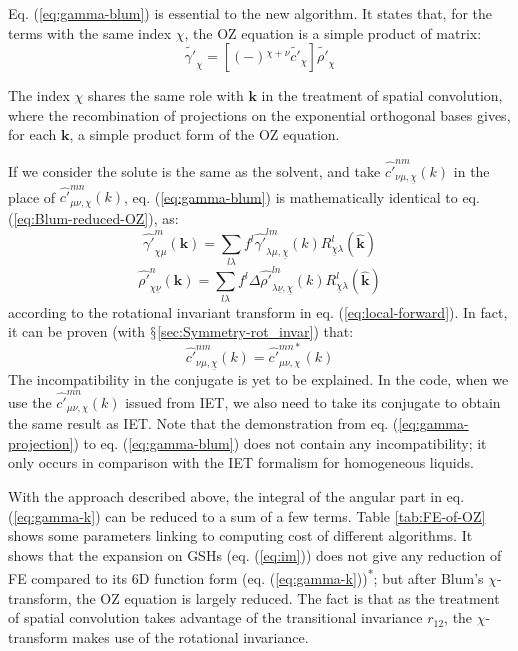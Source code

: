 Eq. (\ref{eq:gamma-blum}) is essential to the new algorithm. It states
that, for the terms with the same index $\chi$, the \acs{OZ} equation
is a simple product of matrix:
\begin{equation}
\tilde{\gamma'}_{\chi}=\left[\left(-\right){}^{\chi+\nu}\tilde{c'}_{\chi}\right]\tilde{\rho'}_{\chi}
\end{equation}

The index $\chi$ shares the same role with $\mathbf{k}$ in the treatment
of spatial convolution, where the recombination of projections on
the exponential orthogonal bases gives, for each $\mathbf{k}$, a simple
product form of the \acs{OZ} equation.

If we consider the solute is the same as the solvent, and take $\hat{c'}_{\nu\mu,\underline{\chi}}^{nm}(k)$
in the place of $\hat{c'}_{\mu\nu,\chi}^{mn}(k)$, eq. (\ref{eq:gamma-blum})
is mathematically identical to eq. (\ref{eq:Blum-reduced-OZ}), as:
\begin{equation}
\hat{\gamma'}_{\chi\mu}^{m}(\mathbf{k})=\sum_{l\lambda}f^{l}\hat{\gamma'}_{\lambda\mu,\underline{\chi}}^{lm}(k)R_{\underline{\chi}\lambda}^{l}(\hat{\mathbf{k}})
\end{equation}
\begin{equation}
\hat{\rho'}_{\chi\underline{\nu}}^{n}(\mathbf{k})=\sum_{l\lambda}f^{l}\Delta\hat{\rho'}_{\lambda\underline{\nu},\underline{\chi}}^{ln}(k)R_{\underline{\chi}\lambda}^{l}(\hat{\mathbf{k}})
\end{equation}
according to the rotational invariant transform in eq. (\ref{eq:local-forward}).
In fact, it can be proven (with $\mathsection$\ref{sec:Symmetry-rot_invar})
that:
\begin{equation}
\hat{c'}_{\nu\mu,\underline{\chi}}^{nm}(k)=\hat{c'}_{\mu\nu,\chi}^{mn*}(k)
\end{equation}
The incompatibility in the conjugate is yet to be explained. In the
code, when we use the $\hat{c'}_{\mu\nu,\chi}^{mn}(k)$ issued from
\acs{IET}, we also need to take its conjugate to obtain the same
result as \acs{IET}. Note that the demonstration from eq. (\ref{eq:gamma-projection})
to eq. (\ref{eq:gamma-blum}) does not contain any incompatibility;
it only occurs in comparison with the \acs{IET} formalism for
homogeneous liquids.

With the approach described above, the integral of the angular part
in eq. (\ref{eq:gamma-k}) can be reduced to a sum of a few terms.
Table \ref{tab:FE-of-OZ} shows some parameters linking to computing
cost of different algorithms. It shows that the expansion on \acs{GSH}s (eq. (\ref{eq:im})) does
not give any reduction of \acs{FE} compared to its 6D function form
(eq. (\ref{eq:gamma-k}))\textsuperscript{{*}}; but after Blum's
$\chi$-transform, the \acs{OZ} equation is largely reduced. The
fact is that as the treatment of spatial convolution takes advantage
of the transitional invariance $r_{12}$, the $\chi$-transform makes
use of the rotational invariance.

